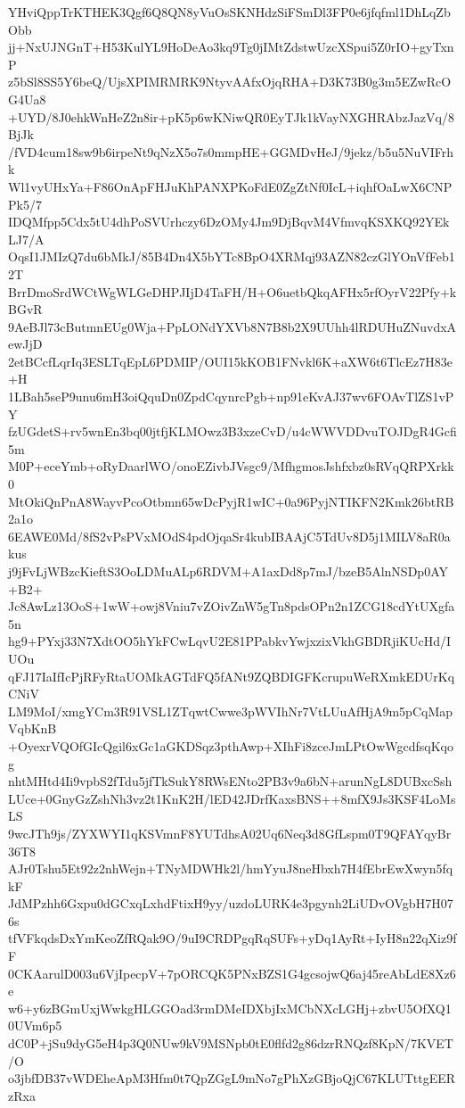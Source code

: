 YHviQppTrKTHEK3Qgf6Q8QN8yVuOsSKNHdzSiFSmDl3FP0e6jfqfml1DhLqZbObb
jj+NxUJNGnT+H53KulYL9HoDeAo3kq9Tg0jIMtZdstwUzcXSpui5Z0rIO+gyTxnP
z5bSl8SS5Y6beQ/UjsXPIMRMRK9NtyvAAfxOjqRHA+D3K73B0g3m5EZwRcOG4Ua8
+UYD/8J0ehkWnHeZ2n8ir+pK5p6wKNiwQR0EyTJk1kVayNXGHRAbzJazVq/8BjJk
/fVD4cum18sw9b6irpeNt9qNzX5o7s0mmpHE+GGMDvHeJ/9jekz/b5u5NuVIFrhk
Wl1vyUHxYa+F86OnApFHJuKhPANXPKoFdE0ZgZtNf0IcL+iqhfOaLwX6CNPPk5/7
IDQMfpp5Cdx5tU4dhPoSVUrhczy6DzOMy4Jm9DjBqvM4VfmvqKSXKQ92YEkLJ7/A
OqsI1JMIzQ7du6bMkJ/85B4Dn4X5bYTc8BpO4XRMqj93AZN82czGlYOnVfFeb12T
BrrDmoSrdWCtWgWLGeDHPJIjD4TaFH/H+O6uetbQkqAFHx5rfOyrV22Pfy+kBGvR
9AeBJl73cButmnEUg0Wja+PpLONdYXVb8N7B8b2X9UUhh4lRDUHuZNuvdxAewJjD
2etBCcfLqrIq3ESLTqEpL6PDMIP/OUI15kKOB1FNvkl6K+aXW6t6TlcEz7H83e+H
1LBah5seP9unu6mH3oiQquDn0ZpdCqynrcPgb+np91eKvAJ37wv6FOAvTlZS1vPY
fzUGdetS+rv5wnEn3bq00jtfjKLMOwz3B3xzeCvD/u4cWWVDDvuTOJDgR4Gcfi5m
M0P+eceYmb+oRyDaarlWO/onoEZivbJVsgc9/MfhgmosJshfxbz0sRVqQRPXrkk0
MtOkiQnPnA8WayvPcoOtbmn65wDcPyjR1wIC+0a96PyjNTIKFN2Kmk26btRB2a1o
6EAWE0Md/8fS2vPsPVxMOdS4pdOjqaSr4kubIBAAjC5TdUv8D5j1MILV8aR0akus
j9jFvLjWBzcKieftS3OoLDMuALp6RDVM+A1axDd8p7mJ/bzeB5AlnNSDp0AY+B2+
Jc8AwLz13OoS+1wW+owj8Vniu7vZOivZnW5gTn8pdsOPn2n1ZCG18cdYtUXgfa5n
hg9+PYxj33N7XdtOO5hYkFCwLqvU2E81PPabkvYwjxzixVkhGBDRjiKUcHd/IUOu
qFJ17IaIfIcPjRFyRtaUOMkAGTdFQ5fANt9ZQBDIGFKcrupuWeRXmkEDUrKqCNiV
LM9MoI/xmgYCm3R91VSL1ZTqwtCwwe3pWVIhNr7VtLUuAfHjA9m5pCqMapVqbKnB
+OyexrVQOfGIcQgil6xGc1aGKDSqz3pthAwp+XIhFi8zceJmLPtOwWgcdfsqKqog
nhtMHtd4Ii9vpbS2fTdu5jfTkSukY8RWsENto2PB3v9a6bN+arunNgL8DUBxcSsh
LUce+0GnyGzZshNh3vz2t1KnK2H/lED42JDrfKaxsBNS++8mfX9Js3KSF4LoMsLS
9wcJTh9js/ZYXWYI1qKSVmnF8YUTdhsA02Uq6Neq3d8GfLspm0T9QFAYqyBr36T8
AJr0Tshu5Et92z2nhWejn+TNyMDWHk2l/hmYyuJ8neHbxh7H4fEbrEwXwyn5fqkF
JdMPzhh6Gxpu0dGCxqLxhdFtixH9yy/uzdoLURK4e3pgynh2LiUDvOVgbH7H076s
tfVFkqdsDxYmKeoZfRQak9O/9uI9CRDPgqRqSUFs+yDq1AyRt+IyH8n22qXiz9fF
0CKAarulD003u6VjIpecpV+7pORCQK5PNxBZS1G4gcsojwQ6aj45reAbLdE8Xz6e
w6+y6zBGmUxjWwkgHLGGOad3rmDMeIDXbjIxMCbNXcLGHj+zbvU5OfXQ10UVm6p5
dC0P+jSu9dyG5eH4p3Q0NUw9kV9MSNpb0tE0flfd2g86dzrRNQzf8KpN/7KVET/O
o3jbfDB37vWDEheApM3Hfm0t7QpZGgL9mNo7gPhXzGBjoQjC67KLUTttgEERzRxa
